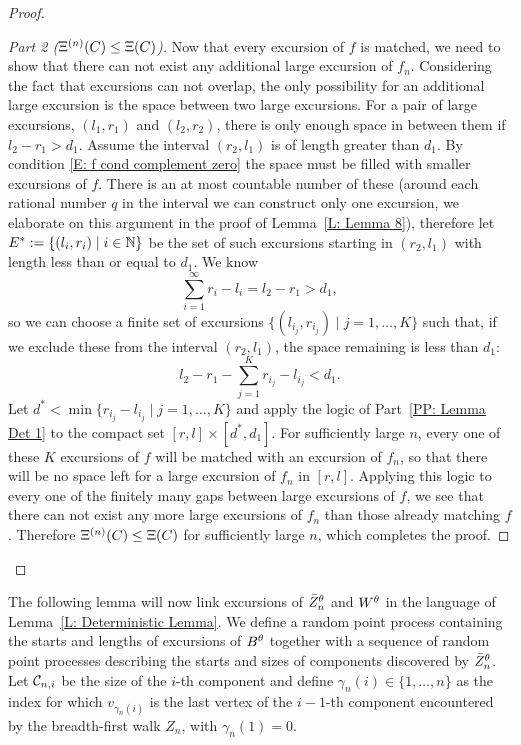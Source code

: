 \begin{proof}
\begin{proof}[Part 2 ($\Xi^{(n)}(C) \leq \Xi(C)$)] \label{PP: Xin in Xi} \label{PP: Lemma Det 2} 
Now that every excursion of $f$ is matched, 
we need to show that there can not exist any additional large excursion of $f_n$.
Considering the fact that excursions can not overlap,
the only possibility for an additional large excursion is the space between two large excursions.
For a pair of large excursions,
$(l_1, r_1)$ and $(l_{2}, r_{2})$,
there is only enough space in between them if
$l_2 - r_{1} > d_1$.
Assume the interval $(r_2,l_1)$ is of length greater than $d_1$.
By condition \eqref{E: f cond complement zero} the space must be filled with smaller excursions of $f$.
There is an at most countable number of these 
(around each rational number $q$ in the interval we can construct only one excursion, we elaborate on this argument in the proof of Lemma~\ref{L: Lemma 8}),
therefore let $E^* := \{ (l_i, r_i) \; | \; i \in \mathbb{N} \}$
be the set of such excursions starting in $(r_2,l_1)$ with length less than or equal to $d_1$.
We know
\begin{equation*} 
\sum_{i=1}^{\infty} r_i - l_i = l_2 - r_1 > d_1,
\end{equation*}
so we can choose a finite set of excursions
$\{ (l_{i_j}, r_{i_j}) \; | \; j = 1, \dots, K \}$
such that, 
if we exclude these from the interval $(r_2,l_1)$, 
the space remaining is less than $d_1$:
\begin{equation*}
l_2 - r_1 - \sum_{j=1}^{K} r_{i_j} - l_{i_j} < d_1.
\end{equation*}
Let $d^* < \min \{ r_{i_j} - l_{i_j} \; | \; j = 1, \dots, K \}$
and apply the logic of Part~\ref{PP: Lemma Det 1} to the compact set
$[r, l] \times [d^*, d_1]$.
For sufficiently large $n$, 
every one of these $K$ excursions of $f$ will be matched with an excursion of $f_n$,
so that there will be no space left for a large excursion of $f_n$ in $[r,l]$.
Applying this logic to every one of the finitely many gaps between large excursions of $f$,
we see that there can not exist any more large excursions of $f_n$ than those already matching $f$.
Therefore $\Xi^{(n)}(C) \leq \Xi(C)$ for sufficiently large $n$, which completes the proof.
\end{proof}
\phantom\qedhere
\end{proof}



The following lemma will now link excursions of $\bar{Z}^{\theta}_n$ and $W^{\theta}$ in the language of Lemma~\ref{L: Deterministic Lemma}.
We define a random point process containing the starts and lengths of excursions of $B^{\theta}$ together with a sequence of random point processes describing the starts and sizes of components discovered by $\bar{Z}^{\theta}_n$.
Let $\mathcal{C}_{n,i}$ be the size of the $i$-th component and
define $\gamma_n(i) \in \{1, \dots, n\}$ as the index for which
$v_{\gamma_n(i)}$ is the last vertex of the $i-1$-th component encountered by the breadth-first walk $Z_n$,
with $\gamma_n(1) = 0$.

